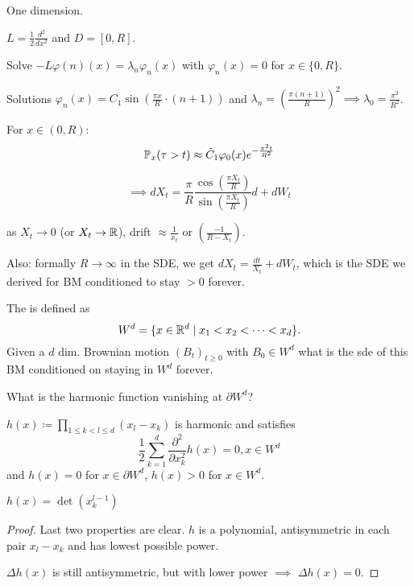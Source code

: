 \begin{example}
    One dimension.

    $L=\frac{1}{2}\frac{d^2}{dx^2}$ and $D=[0,R]$.

    Solve $-L\varphi(n)(x)=\lambda_n\varphi_n(x)$ with $\varphi_n(x)=0$ for $x\in \{0,R\}$.

    Solutions $\varphi_n(x)=C_1\sin\left(\frac{\pi x}{R}\cdot (n+1)\right)$
    and 
    $\lambda_n=\left(\frac{\pi(n+1)}{R}\right)^2\implies \lambda_0=\frac{\pi^2}{R^2}$.

    For $x\in(0,R):$\begin{align*}
        \mathbb{P}_x(\tau>t)\approx \tilde{C}_1 \varphi_0(x)e^{-\frac{\pi^2 t}{R^2}}
    \end{align*}

    \[\implies dX_t=\frac{\pi}{R}\frac{\cos(\frac{\pi X_t}{R})}{\sin(\frac{\pi X_t}{R})}d+dW_t\]

    as $X_t\to 0$ (or $X_t\to\mathbb{R}$), drift $\approx \frac{1}{x_t}$ or $(\frac{-1}{R-X_t})$.

    Also: formally $R\to\infty$ in the SDE, we get $dX_t=\frac{dt}{X_t}+dW_t$, which is the SDE 
    we derived for BM conditioned to stay $>0$ forever.
\end{example}



\begin{example}\label{ex:2.14}
    The  is defined as \[W^d=\{x\in\mathbb{R}^d\mid x_1<x_2<\dots<x_d\}.\]
    Given a $d$ dim. Brownian motion $(B_t)_{t\geq 0}$ with $B_0\in W^d$ what is the sde of 
    this BM conditioned on staying in $W^d$ forever.

    What is the harmonic function vanishing at $\partial W^d$?

\end{example}

\begin{lemma}\label{lem:2.15}
    $h(x)\coloneqq \prod_{1\leq k <l\leq d}(x_l-x_k)$ is harmonic and satisfies 
    \[\frac{1}{2}\sum_{k=1}^d\frac{\partial^2}{\partial x_k^2}h(x)=0,x\in W^d\]
    and $h(x)=0$ for $x\in \partial W^d$, $h(x)>0$ for $x\in W^d$.
\end{lemma}

\begin{remark}
    $h(x)=\det(x_k^{l-1})$
\end{remark}

\begin{proof}
    Last two properties are clear. $h$ is a polynomial, antisymmetric in each pair $x_l-x_k$ and has 
    lowest possible power.

    $\Delta h(x)$ is still antisymmetric, but with lower power $\implies$ $\Delta h(x)=0$.
\end{proof}

